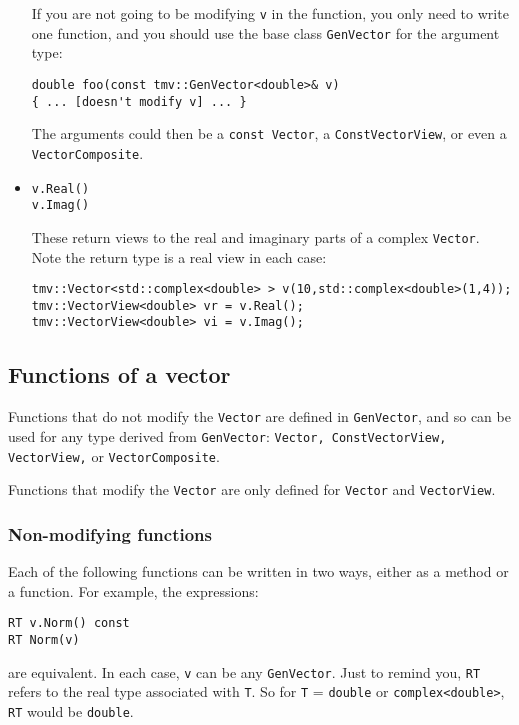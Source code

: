 \documentclass[twoside,letterpaper,11pt]{article}
\renewcommand{\tt}[1]{{\texttt {#1}}}
\begin{document}
\begin{itemize}
If you are not going to be modifying \tt{v} in the function, you only need to
write one function, and you should use the base class \tt{GenVector} 
for the argument type:
\begin{verbatim}
double foo(const tmv::GenVector<double>& v)
{ ... [doesn't modify v] ... }
\end{verbatim}
The arguments could then be a \tt{const Vector}, a \tt{ConstVectorView},
or even a \tt{VectorComposite}.

\item
\begin{verbatim}
v.Real()
v.Imag()
\end{verbatim}
These return views to the real and imaginary parts of a complex \tt{Vector}.
Note the return type is a real view in each case:
\begin{verbatim}
tmv::Vector<std::complex<double> > v(10,std::complex<double>(1,4));
tmv::VectorView<double> vr = v.Real();
tmv::VectorView<double> vi = v.Imag();
\end{verbatim}

\end{itemize}

\subsection{Functions of a vector }

Functions that do not modify the \tt{Vector} are defined in 
\tt{GenVector}, and so can be used for any type derived from \tt{GenVector}:
\tt{Vector, ConstVectorView, VectorView,} or \tt{VectorComposite}.

Functions that modify the \tt{Vector} are only defined for 
\tt{Vector} and \tt{VectorView}.

\subsubsection{Non-modifying functions}

Each of the following functions can be written in two ways, either as a method or a function.
For example, the expressions:
\begin{verbatim}
RT v.Norm() const
RT Norm(v)
\end{verbatim}
are equivalent.  
In each case, \tt{v} can be any \tt{GenVector}.  Just to remind you, \tt{RT} refers to the 
real type associated with \tt{T}.  So for \tt{T} = \tt{double} or \tt{complex<double>},
\tt{RT} would be \tt{double}.
\end{document}
